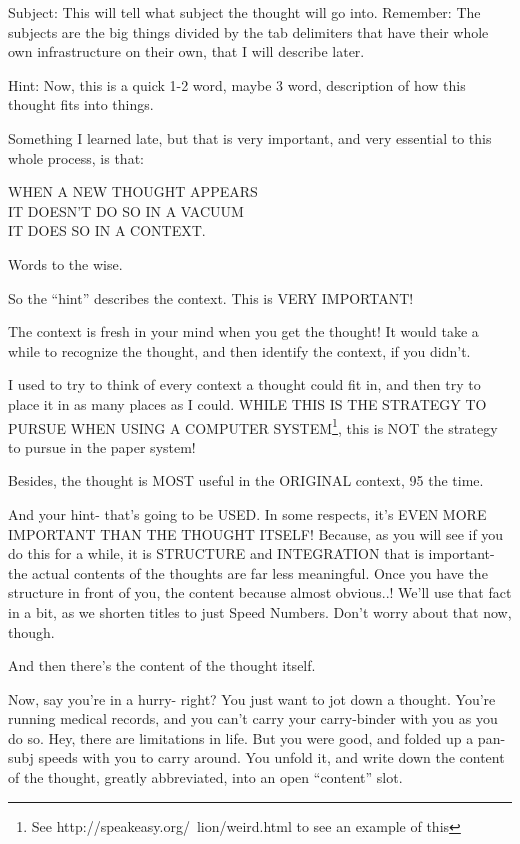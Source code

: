 \documentclass[oneside]{book}
\begin{document}
Subject: This will tell what subject the thought will go
into. Remember: The subjects are the big things divided by the tab
delimiters that have their whole own infrastructure on their own, that
I will describe later.

Hint: Now, this is a quick 1-2 word, maybe 3 word, description of how
this thought fits into things.

Something I learned late, but that is very important, and very
essential to this whole process, is that:

\begin{center}
WHEN A NEW THOUGHT APPEARS\\
IT DOESN'T DO SO IN A VACUUM\\
IT DOES SO IN A CONTEXT.\\
\end{center}

Words to the wise.

So the ``hint'' describes the context. This is
VERY IMPORTANT!

The context is fresh in your mind when you get the thought! It would
take a while to recognize the thought, and then identify the context,
if you didn't.

I used to try to think of every context a thought could fit in, and
then try to place it in as many places as I could. WHILE THIS IS THE
STRATEGY TO PURSUE WHEN USING A COMPUTER SYSTEM\footnote{See
http://speakeasy.org/~lion/weird.html to see an example of this}, this
is NOT the strategy to pursue in the paper system!

Besides, the thought is MOST useful in the ORIGINAL context, 95%
the time.

And your hint- that's going to be USED. In some respects, it's EVEN
MORE IMPORTANT THAN THE THOUGHT ITSELF! Because, as you will see if
you do this for a while, it is STRUCTURE and INTEGRATION that is
important- the actual contents of the thoughts are far less
meaningful. Once you have the structure in front of you, the content
because almost obvious..! We'll use that fact in a bit, as we shorten
titles to just Speed Numbers. Don't worry about that now, though.

And then there's the content of the thought itself.

Now, say you're in a hurry- right? You just want to jot down a
thought. You're running medical records, and you can't carry your
carry-binder with you as you do so. Hey, there are limitations in
life. But you were good, and folded up a pan-subj speeds with you to
carry around. You unfold it, and write down the content of the
thought, greatly abbreviated, into an open ``content'' slot.
\end{document}
